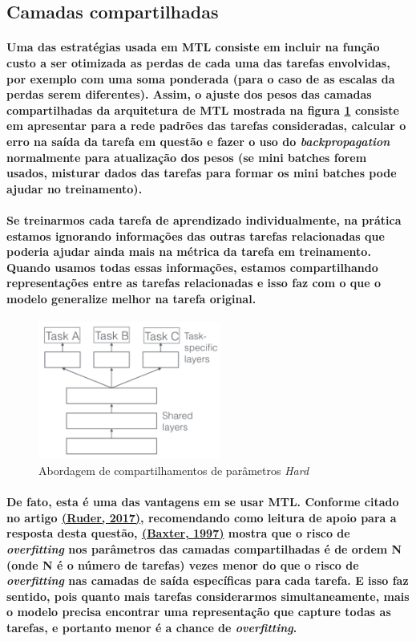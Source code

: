 \documentclass[a4paper]{article}    %
\begin{document}
\subsection{Camadas compartilhadas}
\paragraph{Uma das estratégias usada em MTL consiste em incluir na função custo a ser otimizada as perdas de cada uma das tarefas envolvidas, por exemplo com uma soma ponderada (para o caso de as escalas da perdas serem diferentes). Assim, o ajuste dos pesos das camadas compartilhadas da arquitetura de MTL mostrada na figura \ref{fig:q7} consiste em apresentar para a rede padrões das tarefas consideradas, calcular o erro na saída da tarefa em questão e fazer o uso do \emph{backpropagation} normalmente para atualização dos pesos (se mini batches forem usados, misturar dados das tarefas para formar os mini batches pode ajudar no treinamento).}

\paragraph{Se treinarmos cada tarefa de aprendizado individualmente, na prática estamos ignorando informações das outras tarefas relacionadas que poderia ajudar ainda mais na métrica da tarefa em treinamento. Quando usamos todas essas informações, estamos compartilhando representações entre as tarefas relacionadas e isso faz com o que o modelo generalize melhor na tarefa original.}

\begin{figure}[H]
    \centering
    \includegraphics[width=6cm]{Q7}
    \caption{Abordagem de compartilhamentos de parâmetros \emph{Hard}}
    \label{fig:q7}
\end{figure}

\paragraph{De fato, esta é uma das vantagens em se usar MTL. Conforme citado no artigo \href{https://arxiv.org/pdf/1706.05098.pdf}{(Ruder, 2017)}, recomendando como leitura de apoio para a resposta desta questão, \href{https://link.springer.com/content/pdf/10.1023/A:1007327622663.pdf}{(Baxter, 1997)} mostra que o risco de \emph{overfitting} nos parâmetros das camadas compartilhadas é de ordem N (onde N é o número de tarefas) vezes menor do que o risco de \emph{overfitting } nas camadas de saída específicas para cada tarefa. E isso faz sentido, pois quanto mais tarefas considerarmos simultaneamente, mais o modelo precisa encontrar uma representação que capture todas as tarefas, e portanto menor é a chance de \emph{overfitting}.}
\end{document}

